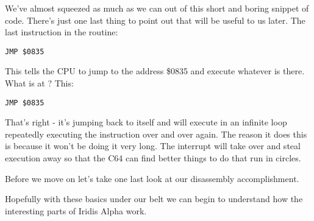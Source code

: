 We've almost squeezed as much as we can out of this short and boring snippet of code. There's just one last thing to point
out that will be useful to us later. The last instruction in the routine:

\begin{lstlisting}[caption=Jump.]
JMP $0835
\end{lstlisting}

This tells the CPU to jump to the address \$0835 and execute whatever is there. What is at ? This:

\begin{lstlisting}[caption=Hello again.]
JMP $0835
\end{lstlisting}

That's right - it's jumping back to itself and will execute in an infinite loop repeatedly executing the instruction
over and over again. The reason it does this is because it won't be doing it very long. The interrupt will take over
and steal execution away so that the C64 can find better things to do that run in circles.

Before we move on let's take one last look at our disassembly accomplishment.



Hopefully with these basics under our belt we can begin to understand how the interesting parts of Iridis Alpha work.
